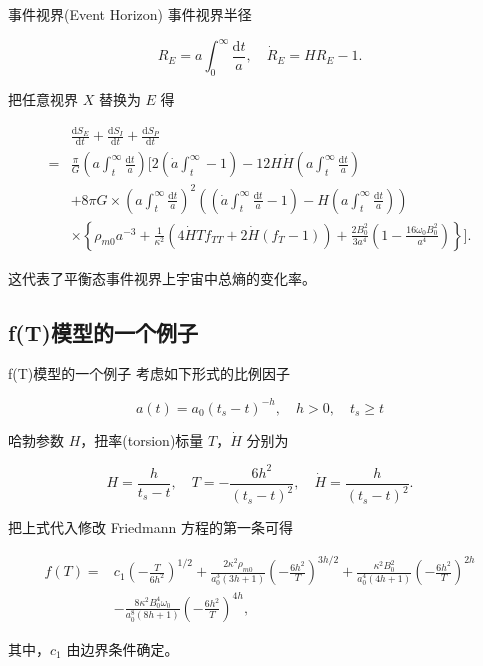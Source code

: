 \documentclass[9pt, dvipsnames]{beamer} %
\begin{document}
\begin{frame}{事件视界(Event Horizon)}
    事件视界半径

    $$
    R_E = a\int_0^{\infty} \frac{\mathrm{d}t }{a } ,\quad
    \dot{R}_E = H R_E - 1.
    $$

    把任意视界 $X$ 替换为 $E$ 得

    $$
    \begin{aligned}
        &\frac{\mathrm{d}S_E}{\mathrm{d}t} + \frac{\mathrm{d}S_I}{\mathrm{d}t} + \frac{\mathrm{d}S_P}{\mathrm{d}t} \\
        =&\frac{\pi}{G} \left(a\int_t^\infty \frac{\mathrm{d}t}{a}\right)\bigg[2\left(\dot{a}\int_t^\infty -1 \right) - 12H\dot{H} \left(a\int_t^\infty \frac{\mathrm{d}t}{a}\right) \\
        &+8\pi G\times \left(a\int_t^\infty\frac{\mathrm{d}t}{a}\right)^2\left(\left(\dot{a}\int_t^\infty\frac{\mathrm{d}t}{a}-1\right)-H\left(a\int_t^\infty\frac{\mathrm{d}t}{a}\right)\right) \\
        &\times \left\{\rho_{m0}a^{-3} + \frac{1}{\kappa^2} \left(4\dot{H}T f_{TT} + 2\dot{H}(f_T-1)\right) + \frac{2B_0^2}{3a^4}\left(1-\frac{16\omega_0B_0^2}{a^4}\right) \right\} \bigg]. 
    \end{aligned}
    $$

    这代表了平衡态事件视界上宇宙中总熵的变化率。

\end{frame}

\subsection{f(T)模型的一个例子}

\begin{frame}{f(T)模型的一个例子}
    考虑如下形式的比例因子

    $$
    a(t)
    =a_0\left(t_s-t \right)^{-h},\quad
    h>0,\quad t_s\geqslant t
    $$

    哈勃参数 $H$，扭率(torsion)标量 $T$，$\dot{{H}}$ 分别为

    $$
    H = \frac{h }{t_s - t } ,\quad
    T = -\frac{6h^2 }{\left(t_s-t \right)^2 } ,\quad
    \dot{H} = \frac{h }{\left(t_s - t \right)^2 }.
    $$

    把上式代入修改 Friedmann 方程的第一条可得

    $$
    \begin{aligned}
        f(T)
        =&c_1\left(-\frac{T }{6h^2 }  \right)^{1/2} + \frac{2\kappa^2 \rho_{m0} }{a_0^3\left(3h+1 \right) } \left(-\frac{6h^2 }{T }  \right)^{3h/2} + \frac{\kappa^2 B_0^2 }{a_0^4\left(4h+1 \right) } \left(-\frac{6h^2 }{T }  \right)^{2h} \\
        &- \frac{8\kappa^2 B_0^4 \omega_0 }{a_0^8 \left(8h+1 \right) } \left(-\frac{6h^2 }{T }  \right)^{4h},
    \end{aligned}
    $$

    其中，$c_1$ 由边界条件确定。

\end{frame}
\end{document}
